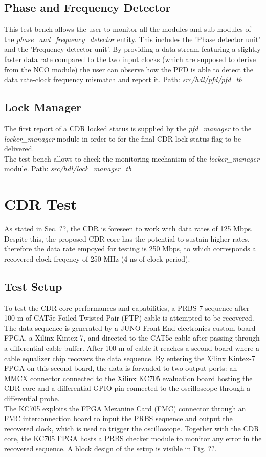 \documentclass[11pt]{article}
\renewcommand{\>}{\rangle} \renewcommand{\emptyset}{\varnothing}
\begin{document}
\subsection{Phase and Frequency Detector}
This test bench allows the user to monitor all the modules and sub-modules of
the \textit{phase\_and\_frequency\_detector} entity. This includes the 'Phase
detector unit' and the 'Frequency detector unit'. By providing a data stream
featuring a slightly faster data rate compared to the two input clocks (which
are supposed to derive from the NCO module) the user can observe how the PFD is
able to detect the data rate-clock frequency mismatch and report it.\bigbreak
Path: \textit{src/hdl/pfd/pfd\_tb}

\subsection{Lock Manager}
The first report of a CDR locked status is supplied by the \textit{pfd\_manager}
to the \textit{locker\_manager} module in order to for the final CDR lock status
flag to be delivered.\\
The test bench allows to check the monitoring mechanism of the
\textit{locker\_manager} module. \bigbreak Path:
\textit{src/hdl/lock\_manager\_tb}

\section{CDR Test}
As stated in Sec. ??, the CDR is foreseen to work with data rates of 125 Mbps.
Despite this, the proposed CDR core has the potential to sustain higher rates,
therefore the data rate empoyed for testing is 250 Mbps, to which corresponds a
recovered clock freqency of 250 MHz (4 ns of clock period).

\subsection{Test Setup}
To test the CDR core performances and capabilities, a PRBS-7 sequence after 100
m of CAT5e Foiled Twisted Pair (FTP) cable is attempted to be recovered. The
data sequence is generated by a JUNO Front-End electronics custom board FPGA, a
Xilinx Kintex-7, and directed to the CAT5e cable after passing through a
differential cable buffer. After 100 m of cable it reaches a second board where
a cable equalizer chip recovers the data sequence. By entering the Xilinx
Kintex-7 FPGA on this second board, the data is forwaded to two output ports: an
MMCX connector connected to the Xilinx KC705 evaluation board hosting the CDR
core and a differential GPIO pin connected to the oscilloscope through a
differential probe. \\
The KC705 exploits the FPGA Mezanine Card (FMC) connector through an FMC
interconnection board to input the PRBS sequence and output the recovered clock,
which is used to trigger the oscilloscope. Together with the CDR core, the KC705
FPGA hosts a PRBS checker module to monitor any error in the recovered sequence.
A block design of the setup is visible in Fig. ??.
\end{document}
